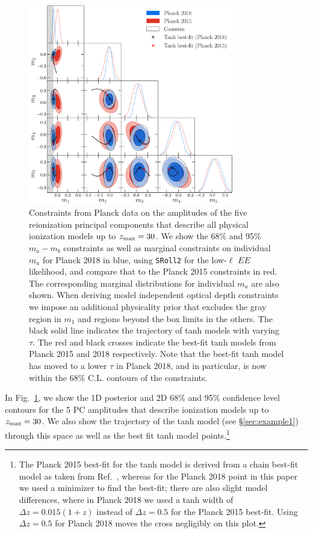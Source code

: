 \documentclass[aps,prd,twocolumn,amsmath,amssymb,showpacs,floatfix,superscriptaddress,nofootinbib]{revtex4-1}
\newcommand{\zmax}{z_{\rm max}}
\begin{document}
\begin{figure}
\includegraphics[width=0.8\textwidth]{plot_mj_triangle_t18_r12_t19_t20_vs_pl18_pc_zmax30_pliklite_srollv2_1015_wTauTrajectory_pl15_wTanhML_wGaussEllipse.pdf}
\caption{Constraints from Planck data on the amplitudes of the five reionization principal components that describe all physical ionization models up to $z_{\rm max} = 30$. We show  the 68\% and 95\% $m_a-m_b$ constraints as well as marginal constraints on individual $m_a$ for Planck 2018 in blue,
using \texttt{SRoll2} for the low-$\ell$ $EE$ likelihood, and compare that to the Planck 2015 constraints in red.  The corresponding marginal distributions for individual $m_a$ are also shown.
When deriving model independent optical depth constraints we impose an additional physicality prior that excludes the gray region in $m_1$ and regions beyond the box limits in the others.
 The black solid line indicates the trajectory of tanh models with varying $\tau$. The red and black crosses indicate the best-fit tanh models from Planck 2015 and 2018 respectively. Note that the best-fit tanh model has moved to a lower $\tau$ in Planck 2018, and in particular, is now within the 68\% C.L. contours of the constraints.
}
\label{fig:plot_mjs_2018_vs_2015}
\end{figure}
%
%
%
%
In Fig.~\ref{fig:plot_mjs_2018_vs_2015}, we show the 1D posterior and 2D 68\% and 95\% confidence level contours for the 5 PC amplitudes that describe ionization models up to $\zmax=30$. We also show the trajectory of the tanh model (see \S \ref{sec:example1}) through this space as well as the best fit tanh model points.\footnote{The Planck 2015 best-fit for the tanh model is derived from a chain best-fit model as taken from Ref.~\cite{Heinrich:2016ojb}, whereas for the Planck 2018 point in this paper we used a minimizer to find the best-fit; there are also slight model differences, where in Planck 2018 we used a tanh width of $\Delta z = 0.015(1+z)$ instead of $\Delta z = 0.5$ for the Planck 2015 best-fit. Using $\Delta z = 0.5$ for Planck 2018 moves the cross negligibly on this plot.}
\end{document}
